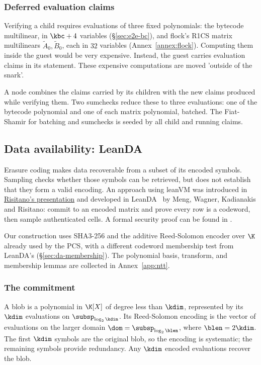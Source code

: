 \subsubsection{Deferred evaluation claims}\label{sec:deferred-claims}

Verifying a child requires evaluations of three fixed polynomials: the bytecode multilinear, in $\kbc+4$ variables (\S\ref{sec:e2e-bc}), and flock's R1CS matrix multilinears $\widetilde A_0,\widetilde B_0$, each in $32$ variables (Annex~\ref{annex:flock}). Computing them inside the guest would be very expensive. Instead, the guest carries evaluation claims in its statement. These expensive computations are moved 'outside of the snark'.

A node combines the claims carried by its children with the new claims produced while verifying them. Two sumchecks reduce these to three evaluations: one of the bytecode polynomial and one of each matrix polynomial, batched. The Fiat-Shamir for batching and sumchecks is seeded by all child and running claims.

\subsection{Data availability: LeanDA}\label{sec:leanda}

Erasure coding makes data recoverable from a subset of its encoded symbols. Sampling checks whether those symbols can be retrieved, but does not establish that they form a valid encoding. An approach using leanVM was introduced in \href{https://frisitano.github.io/slides/presentations/leanvm-fold-in-circuit-das-2026-05-08/index.html}{Risitano's presentation} and developed in LeanDA~\cite{LeanDA} by Meng, Wagner, Kadianakis and Risitano: commit to an encoded matrix and prove every row is a codeword, then sample authenticated cells. A formal security proof can be found in \cite{LeanDASecurity}.

Our construction uses SHA3-256 and the additive Reed-Solomon encoder over $\K$ already used by the PCS, with a different codeword membership test from LeanDA's (\S\ref{sec:da-membership}). The polynomial basis, transform, and membership lemmas are collected in Annex~\ref{app:ntt}.


\subsubsection{The commitment}\label{sec:da-commit}

A blob is a polynomial in $\K[X]$ of degree less than $\kdim$, represented by its $\kdim$ evaluations on $\subsp_{\log_2\kdim}$. Its Reed-Solomon encoding is the vector of evaluations on the larger domain $\dom=\subsp_{\log_2\blen}$, where $\blen=2\kdim$. The first $\kdim$ symbols are the original blob, so the encoding is systematic; the remaining symbols provide redundancy. Any $\kdim$ encoded evaluations recover the blob.


